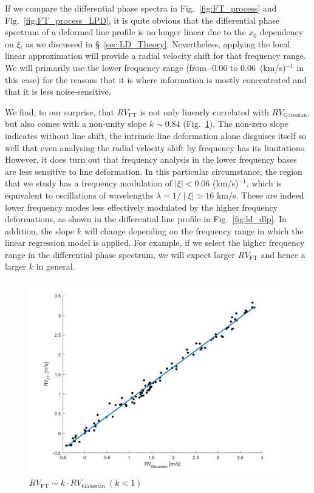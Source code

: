 If we compare the differential phase spectra in Fig.~\ref{fig:FT_process} and Fig.~\ref{fig:FT_process_LPD},
it is quite obvious that the differential phase spectrum of a deformed line profile is no longer linear 
due to the $x_0$ dependency on $\xi$, as we discussed in \S~\ref{sec:LD_Theory}. Nevertheless, applying the 
local linear approximation will provide a radial velocity shift for that frequency range. We will primarily 
use the lower frequency range (from -0.06 to 0.06~(km/s)$^{-1}$ in this case) for the reasons that 
it is where information is mostly concentrated and that it is less noise-sensitive. 

We find, to our surprise, that $RV_\text{FT}$ is not only linearly correlated with $RV_\text{Gaussian}$, 
but also comes with a non-unity slope $k \sim 0.84$ (Fig.~\ref{fig:FT_vs_Gaussian}). 
The non-zero slope indicates without line shift, the intrinsic line deformation alone
disguises itself so well that even analysing the radial velocity shift by frequency has its limitations.
However, it does turn out that frequency analysis in the lower frequency bases 
are less sensitive to line deformation. In this particular circumstance, the region that we study has a frequency modulation of 
$\mid\xi\mid < 0.06$ (km/s)$^{-1}$, which is equivalent to oscillations of wavelengths $\lambda = 1/\mid\xi\mid > 16$ km/s.
These are indeed lower frequency modes less effectively modulated by the higher frequency deformations, as shown in the 
differential line profile in Fig.~\ref{fig:ld_dlp}. In addition, the slope $k$ will change depending on the 
frequency range in which the linear regression model is applied. 
For example, if we select the higher frequency range in the differential phase spectrum, we will 
expect larger $RV_\text{FT}$ and hence a larger $k$ in general. 

\begin{figure}[htbp]
\centering
\includegraphics[width = 0.8 \linewidth]
{./Figures/Methods/5-JITTER_ONLY_1.png}
\caption[Fourier transform in response to line deformation]
{$RV_\text{FT} \sim k \cdot RV_\text{Gaussian}~(k<1)$}
\label{fig:FT_vs_Gaussian}
\end{figure} 


